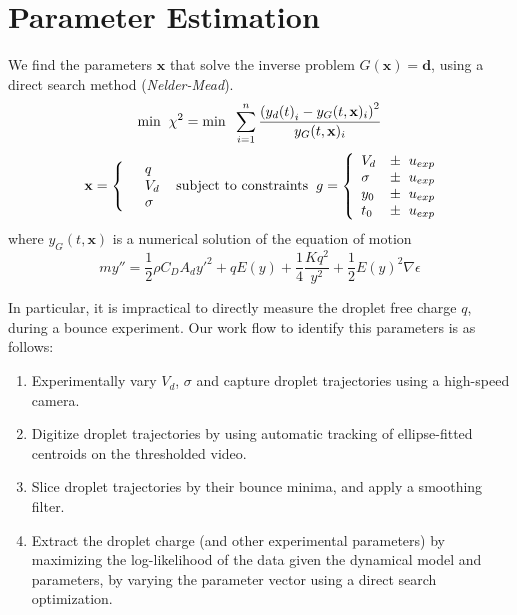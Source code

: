 \documentclass[10pt,a4paper]{article}
\begin{document}
\section{Parameter Estimation}
We find the parameters $\mathbf{x}$ that solve the inverse problem $G(\mathbf{x}) = \mathbf{d}$, using a direct search method (\emph{Nelder-Mead}). 
\[
\mbox{min} \hspace{2 mm} \chi^2 = \mbox{min} \hspace{2 mm} \sum^n_{i=1} \frac{\left({y_d(t)}_i - y_G(t, \mathbf{x})_i \right)^2}{y_G(t, \mathbf{x})_i}
\]
\begin{eqnarray*} \mbox{} \hspace{2 mm} \begin{split} \mathbf{x} = \left\{ \begin{array}{ll}      & q\\
		  &	V_d\\
          & \sigma 
          \end{array} \right. 
          \end{split} \hspace{2 mm} \mbox{subject to constraints} \hspace{2 mm} \begin{split}
          g = \left\{ \begin{array}{ll}
           V_d &\pm \hspace{2 mm} u_{exp}\\
      	   \sigma &\pm  \hspace{2 mm} u_{exp}\\
      	   y_0 &\pm \hspace{2 mm} u_{exp}\\
      	   t_0 &\pm \hspace{2 mm} u_{exp}\\
          \end{array} \right. 
          \end{split}
\end{eqnarray*}
where $y_G(t, \mathbf{x})$ is a numerical solution of the equation of motion
\[
m y'' = \frac{1}{2} \rho C_D A_d {y'}^2 + q E(y) + \frac{1}{4} \frac{K q^2}{y^2} + \frac{1}{2} {E(y)}^2 \nabla \epsilon\]

In particular, it is impractical to directly measure the droplet free charge $q$, during a bounce experiment. Our work flow to identify this parameters is as follows:
\begin{enumerate}
\item Experimentally vary $V_d$, $\sigma$ and capture droplet trajectories using a high-speed camera.
\item Digitize droplet trajectories by using automatic tracking of ellipse-fitted centroids on the thresholded video.
\item Slice droplet trajectories by their bounce minima, and apply a smoothing filter.
\item Extract the droplet charge (and other experimental parameters) by maximizing the log-likelihood of the data given the dynamical model and parameters, by varying the parameter vector using a direct search optimization. 
\end{enumerate}
\end{document}
